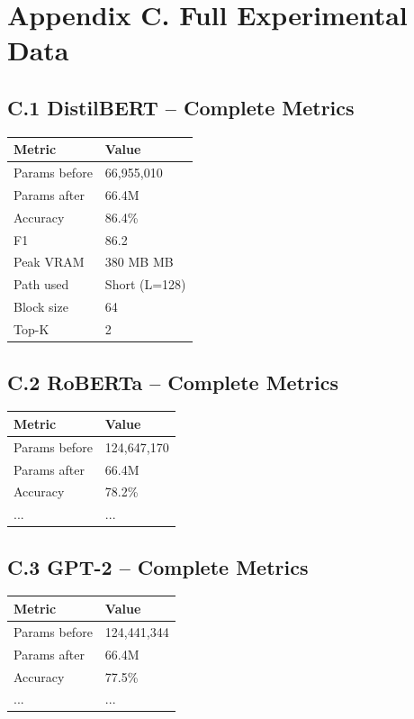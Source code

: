 \section{Appendix C. Full Experimental Data}

\subsection{C.1 DistilBERT -- Complete Metrics}

\begin{table}[H]
\centering
\small
\begin{tabular}{ll}
\toprule
\textbf{Metric} & \textbf{Value} \\
\midrule
Params before & 66,955,010 \\
Params after & 66.4M \\
Accuracy & 86.4\% \\
F1 & 86.2 \\
Peak VRAM & 380 MB MB \\
Path used & Short (L=128) \\
Block size & 64 \\
Top-K & 2 \\
\bottomrule
\end{tabular}
\end{table}

\subsection{C.2 RoBERTa -- Complete Metrics}

\begin{table}[H]
\centering
\small
\begin{tabular}{ll}
\toprule
\textbf{Metric} & \textbf{Value} \\
\midrule
Params before & 124,647,170 \\
Params after & 66.4M \\
Accuracy & 78.2\% \\
... & ... \\
\bottomrule
\end{tabular}
\end{table}

\subsection{C.3 GPT-2 -- Complete Metrics}

\begin{table}[H]
\centering
\small
\begin{tabular}{ll}
\toprule
\textbf{Metric} & \textbf{Value} \\
\midrule
Params before & 124,441,344 \\
Params after & 66.4M \\
Accuracy & 77.5\% \\
... & ... \\
\bottomrule
\end{tabular}
\end{table}

